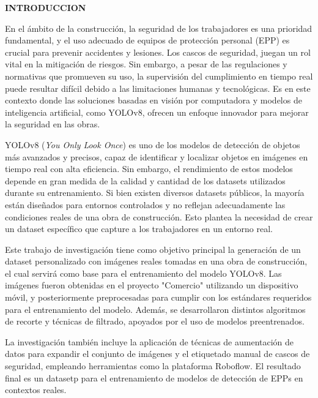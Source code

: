 \thispagestyle{plain}

\begin{center}
  \textbf{INTRODUCCION}
\end{center}

\vspace{1cm}

\noindent
En el ámbito de la construcción, la seguridad de los trabajadores es una prioridad fundamental, y el uso adecuado de equipos de protección personal (EPP) es crucial para prevenir accidentes y lesiones. Los cascos de seguridad, juegan un rol vital en la mitigación de riesgos. Sin embargo, a pesar de las regulaciones y normativas que promueven su uso, la supervisión del cumplimiento en tiempo real puede resultar difícil debido a las limitaciones humanas y tecnológicas. Es en este contexto donde las soluciones basadas en visión por computadora y modelos de inteligencia artificial, como YOLOv8, ofrecen un enfoque innovador para mejorar la seguridad en las obras.

YOLOv8 (\textit{You Only Look Once}) es uno de los modelos de detección de objetos más avanzados y precisos, capaz de identificar y localizar objetos en imágenes en tiempo real con alta eficiencia. Sin embargo, el rendimiento de estos modelos depende en gran medida de la calidad y cantidad de los datasets utilizados durante su entrenamiento. Si bien existen diversos datasets públicos, la mayoría están diseñados para entornos controlados y no reflejan adecuadamente las condiciones reales de una obra de construcción. Esto plantea la necesidad de crear un dataset específico que capture a los trabajadores en un entorno real.

Este trabajo de investigación tiene como objetivo principal la generación de un dataset personalizado con imágenes reales tomadas en una obra de construcción, el cual servirá como base para el entrenamiento del modelo YOLOv8. Las imágenes fueron obtenidas en el proyecto "Comercio" utilizando un dispositivo móvil, y posteriormente preprocesadas para cumplir con los estándares requeridos para el entrenamiento del modelo. Además, se desarrollaron distintos algoritmos de recorte y técnicas de filtrado, apoyados por el uso de modelos preentrenados.

La investigación también incluye la aplicación de técnicas de aumentación de datos para expandir el conjunto de imágenes y el etiquetado manual de cascos de seguridad, empleando herramientas como la plataforma Roboflow. El resultado final es un datasetp para el entrenamiento de modelos de detección de EPPs en contextos reales.

\vfill

\pagebreak